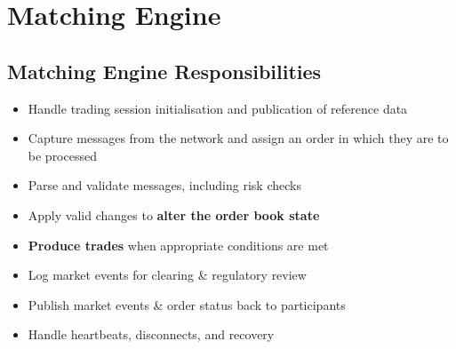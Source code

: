 \documentclass{article}
\begin{document}
\section{Matching Engine}

\subsection{Matching Engine Responsibilities}
\begin{itemize}
	\item Handle trading session initialisation and publication of reference data
	\item Capture messages from the network and assign an order in which they are to be processed
	\item Parse and validate messages, including risk checks
	\item Apply valid changes to \textbf{alter the order book state}
	\item \textbf{Produce trades} when appropriate conditions are met
	\item Log market events for clearing \& regulatory review
	\item Publish market events \& order status back to participants
	\item Handle heartbeats, disconnects, and recovery
\end{itemize}
\end{document}
